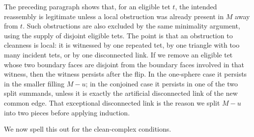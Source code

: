 \documentclass[12pt]{article}
\begin{document}
The preceding paragraph shows that, for an eligible tet $t$, the intended
reassembly is legitimate unless a local obstruction was already present in
$M$ away from $t$.  Such obstructions are also excluded by the same
minimality argument, using the supply of disjoint eligible tets.  The point
is that an obstruction to cleanness is local: it is witnessed by one repeated
tet, by one triangle with too many incident tets, or by one disconnected
link.  If we remove an eligible tet whose two boundary faces are disjoint
from the boundary faces involved in that witness, then the witness persists
after the flip.  In the one-sphere case it persists in the smaller filling
$M-u$; in the conjoined case it persists in one of the two split summands,
unless it is exactly the artificial disconnected link of the new common edge.
That exceptional disconnected link is the reason we split $M-u$ into two
pieces before applying induction.

We now spell this out for the clean-complex conditions.
\end{document}

